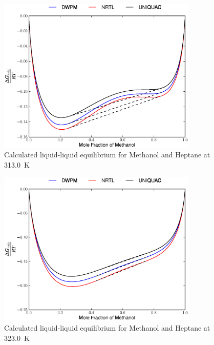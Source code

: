 \begin{figure}[hp]
\centering
\includegraphics[width = 0.85\textwidth]{Results_Parts/BinaryParams/methanol-heptane/AllModelsGibbsPlots/T_313.eps}
\caption{Calculated liquid-liquid equilibrium for Methanol and Heptane at 313.0~$\mathrm{K}$} 
\end{figure}

\begin{figure}[hp]
\centering
\includegraphics[width = 0.85\textwidth]{Results_Parts/BinaryParams/methanol-heptane/AllModelsGibbsPlots/T_323.eps}
\caption{Calculated liquid-liquid equilibrium for Methanol and Heptane at 323.0~$\mathrm{K}$} \label{methanol-heptane323}
\end{figure}

\clearpage



